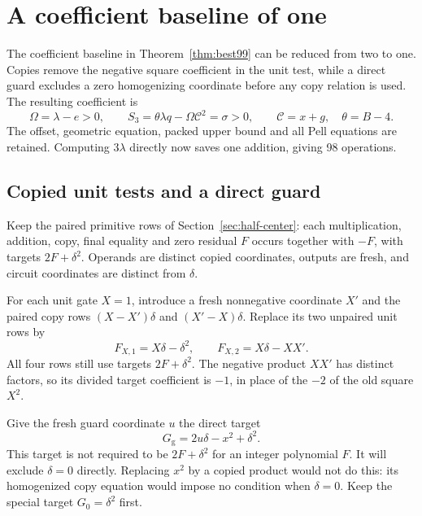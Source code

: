 \section{A coefficient baseline of one}\label{sec:unit-center}

The coefficient baseline in Theorem~\ref{thm:best99} can be reduced
from two to one. Copies remove the negative square coefficient in
the unit test, while a direct guard excludes a zero homogenizing
coordinate before any copy relation is used. The resulting
coefficient is
\begin{equation}\label{eq:unit-center-block}
 \Omega=\lambda-e>0,\qquad
 S_3=\theta\lambda q-\Omega\mathcal C^2=\sigma>0,
 \qquad\mathcal C=x+g,\quad\theta=B-4.
\end{equation}
The offset, geometric equation, packed upper bound and all Pell
equations are retained. Computing $3\lambda$ directly now saves
one addition, giving 98 operations.

\subsection{Copied unit tests and a direct guard}

Keep the paired primitive rows of Section~\ref{sec:half-center}:
each multiplication, addition, copy, final equality and zero
residual $F$ occurs together with $-F$, with targets
$2F+\delta^2$. Operands are distinct copied coordinates, outputs
are fresh, and circuit coordinates are distinct from $\delta$.

For each unit gate $X=1$, introduce a fresh nonnegative coordinate
$X'$ and the paired copy rows $(X-X')\delta$ and $(X'-X)\delta$.
Replace its two unpaired unit rows by
\begin{equation}\label{eq:unit-center-unit}
 F_{X,1}=X\delta-\delta^2,\qquad
 F_{X,2}=X\delta-XX'.
\end{equation}
All four rows still use targets $2F+\delta^2$. The negative product
$XX'$ has distinct factors, so its divided target coefficient is
$-1$, in place of the $-2$ of the old square $X^2$.

Give the fresh guard coordinate $u$ the direct target
\begin{equation}\label{eq:unit-center-guard}
 G_{\mathrm g}=2u\delta-x^2+\delta^2.
\end{equation}
This target is not required to be $2F+\delta^2$ for an integer
polynomial $F$. It will exclude $\delta=0$ directly. Replacing
$x^2$ by a copied product would not do this: its homogenized copy
equation would impose no condition when $\delta=0$.
Keep the special target $G_0=\delta^2$ first.

